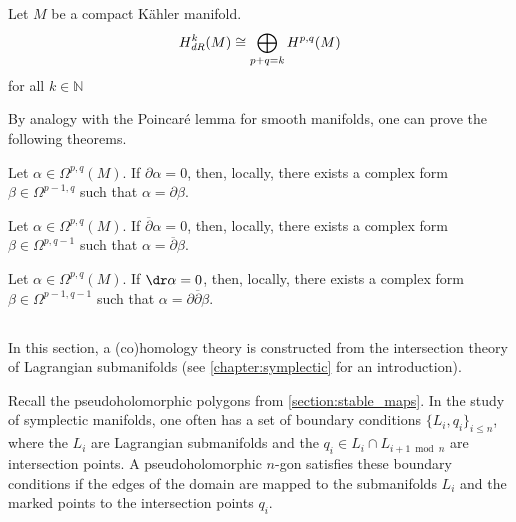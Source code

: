     \begin{theorem}
        Let $M$ be a compact K\"ahler manifold.
        \begin{gather}
            H^k_{\emph{dR}}(M)\cong\bigoplus_{p+q=k}H^{p,q}(M)
        \end{gather}
        for all $k\in\mathbb{N}$
    \end{theorem}

    By analogy with the Poincar\'e lemma for smooth manifolds, one can prove the following theorems.
    \begin{theorem}
        Let $\alpha\in\Omega^{p,q}(M)$. If $\partial\alpha = 0$, then, locally, there exists a complex form $\beta\in\Omega^{p-1,q}$ such that $\alpha = \partial\beta$.
    \end{theorem}
    \begin{theorem}
        Let $\alpha\in\Omega^{p,q}(M)$. If $\overline{\partial}\alpha = 0$, then, locally, there exists a complex form $\beta\in\Omega^{p,q-1}$ such that $\alpha = \overline{\partial}\beta$.
    \end{theorem}
    \begin{theorem}\label{complex:del_delbar_lemma}
        Let $\alpha\in\Omega^{p,q}(M)$. If $\dr\alpha = 0$, then, locally, there exists a complex form $\beta\in\Omega^{p-1,q-1}$ such that $\alpha = \partial\overline{\partial}\beta$.
    \end{theorem}

\subsection{}

    In this section, a (co)homology theory is constructed from the intersection theory of Lagrangian submanifolds (see \cref{chapter:symplectic} for an introduction).

    Recall the pseudoholomorphic polygons from \cref{section:stable_maps}. In the study of symplectic manifolds, one often has a set of boundary conditions $\{L_i,q_i\}_{i\leq n}$, where the $L_i$ are Lagrangian submanifolds and the $q_i\in L_i\cap L_{i+1\bmod n}$ are intersection points. A pseudoholomorphic $n$-gon satisfies these boundary conditions if the edges of the domain are mapped to the submanifolds $L_i$ and the marked points to the intersection points $q_i$.

